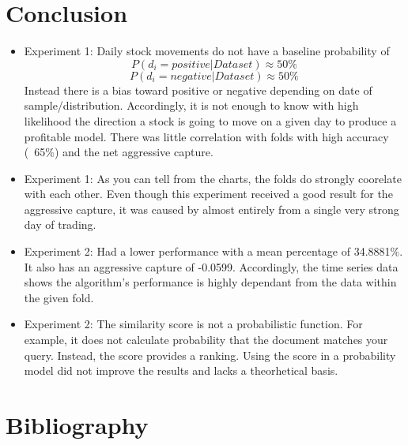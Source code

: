 \documentclass[11pt,letterpaper]{article}
\newcommand{\blue}[1]{\textcolor{RoyalBlue}{#1}}
\newcommand{\instructions}[1]{\blue{\textit{#1}}}
\begin{document}
\section{Conclusion}
\begin{itemize}
\item Experiment 1: Daily stock movements do not have a baseline probability of
\[
  	P(\text{\(d_i = positive\)} | \text{\(Dataset\)}) \approx 50\%
\]
\[
  	P(\text{\(d_i = negative\)} | \text{\(Dataset\)}) \approx 50\%
\]
  Instead there is a bias toward positive or negative depending on date of sample/distribution.
  Accordingly, it is not enough to know with high likelihood the direction a
  stock is going to move on a given day to produce a profitable model. There
  was little correlation with folds with high accuracy (~65\%) and the
  net aggressive capture.
\item Experiment 1:  As you can tell from the charts, the folds do
  strongly coorelate with each other. Even though this experiment received a
  good result for the aggressive capture, it was caused by almost entirely from
  a single very strong day of trading.
\item Experiment 2: Had a lower performance with a mean percentage of 34.8881\%.
  It also has an aggressive capture of -0.0599. Accordingly, the time series
  data shows the algorithm's performance is
  highly dependant from the data within the given fold.
\item Experiment 2:  The similarity score is not a probabilistic function. For example, it does not
  calculate probability that the document matches your query. Instead, the score
  provides a ranking. Using the score in a probability model did not
  improve the results and lacks a theorhetical basis.

\end{itemize}


\section*{Bibliography}
{}

\end{document}
